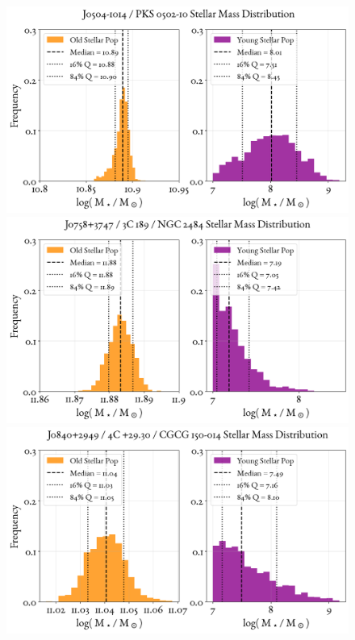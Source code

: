 \begin{figure}
    \centering
    \includegraphics[width=0.8\linewidth]{figures/ResultMasses/19_MassDistri_1765.png}\\
    \includegraphics[width=0.8\linewidth]{figures/ResultMasses/25_MassDistri_1971.png}\\
    \includegraphics[width=0.8\linewidth]{figures/ResultMasses/28_MassDistri_2029.png}    
\end{figure}
